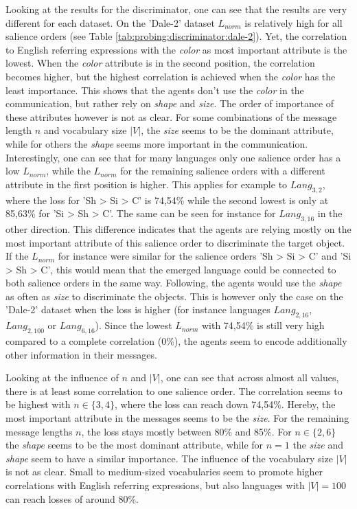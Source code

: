 Looking at the results for the discriminator, one can see that the results are very different for each dataset.
On the 'Dale-2' dataset $L_{norm}$ is relatively high for all salience orders (see Table \ref{tab:probing:discriminator:dale-2}).
Yet, the correlation to English referring expressions with the \emph{color} as most important attribute is the lowest.
When the \emph{color} attribute is in the second position, the correlation becomes higher, but the highest correlation is achieved when the \emph{color} has the least importance.
This shows that the agents don't use the \emph{color} in the communication, but rather rely on \emph{shape} and \emph{size}.
The order of importance of these attributes however is not as clear.
For some combinations of the message length $n$ and vocabulary size $|V|$, the \emph{size} seems to be the dominant attribute, while for others the \emph{shape} seems more important in the communication.
Interestingly, one can see that for many languages only one salience order has a low $L_{norm}$, while the $L_{norm}$ for the remaining salience orders with a different attribute in the first position is higher.
This applies for example to $Lang_{3,2}$, where the loss for 'Sh > Si > C' is 74,54\% while the second lowest is only at 85,63\% for 'Si > Sh > C'.
The same can be seen for instance for $Lang_{3,16}$ in the other direction.
This difference indicates that the agents are relying mostly on the most important attribute of this salience order to discriminate the target object.
If the $L_{norm}$ for instance were similar for the salience orders 'Sh > Si > C' and 'Si > Sh > C', this would mean that the emerged language could be connected to both salience orders in the same way.
Following, the agents would use the \emph{shape} as often as \emph{size} to discriminate the objects.
This is however only the case on the 'Dale-2' dataset when the loss is higher (for instance languages $Lang_{2,16}$, $Lang_{2,100}$ or $Lang_{6,16}$).
Since the lowest $L_{norm}$ with 74,54\% is still very high compared to a complete correlation (0\%), the agents seem to encode additionally other information in their messages.

Looking at the influence of $n$ and $|V|$, one can see that across almost all values, there is at least some correlation to one salience order.
The correlation seems to be highest with $n \in \{3,4\}$, where the loss can reach down 74,54\%.
Hereby, the most important attribute in the messages seems to be the \emph{size}.
For the remaining message lengths $n$, the loss stays mostly between 80\% and 85\%.
For $n \in \{2,6\}$ the \emph{shape} seems to be the most dominant attribute, while for $n=1$ the \emph{size} and \emph{shape} seem to have a similar importance.
The influence of the vocabulary size $|V|$ is not as clear.
Small to medium-sized vocabularies seem to promote higher correlations with English referring expressions, but also languages with $|V|=100$ can reach losses of around 80\%.

